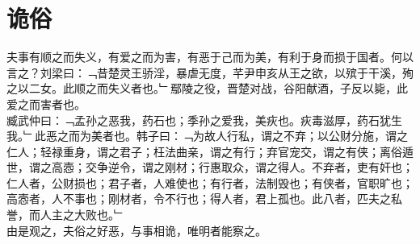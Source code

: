 \chapter{诡俗}%
夫事有顺之而失义，有爱之而为害，有恶于己而为美，有利于身而损于国者。何以言之？刘梁曰：﹁昔楚灵王骄淫，暴虐无度，芊尹申亥从王之欲，以殡于干溪，殉之以二女。此顺之而失义者也。﹂鄢陵之役，晋楚对战，谷阳献酒，子反以毙，此爱之而害者也。\\
臧武仲曰：﹁孟孙之恶我，药石也；季孙之爱我，美疢也。疢毒滋厚，药石犹生我。﹂此恶之而为美者也。韩子曰：﹁为故人行私，谓之不弃；以公财分施，谓之仁人；轻禄重身，谓之君子；枉法曲亲，谓之有行；弃官宠交，谓之有侠；离俗遁世，谓之高悫；交争逆令，谓之刚材；行惠取众，谓之得人。不弃者，吏有奸也；仁人者，公财损也；君子者，人难使也；有行者，法制毁也；有侠者，官职旷也；高悫者，人不事也；刚材者，令不行也；得人者，君上孤也。此八者，匹夫之私誉，而人主之大败也。﹂\\
由是观之，夫俗之好恶，与事相诡，唯明者能察之。\\%
%
